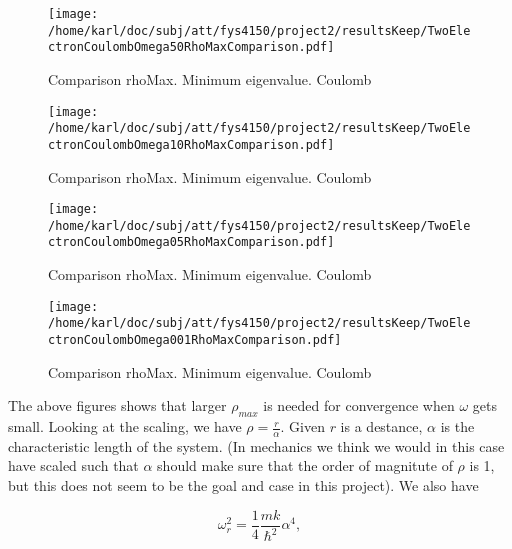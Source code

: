 \documentclass{article}
\begin{document}
\begin{minipage}{.49\textwidth} %
	\begin{figure}[H]
		\centering
		\texttt{[image: /home/karl/doc/subj/att/fys4150/project2/resultsKeep/TwoElectronCoulombOmega50RhoMaxComparison.pdf]}
		\caption{Comparison rhoMax. Minimum eigenvalue. Coulomb}
		\label{1}
	\end{figure}
\end{minipage}\hfill
\begin{minipage}{.49\textwidth}
	\begin{figure}[H]
		\centering
		\texttt{[image: /home/karl/doc/subj/att/fys4150/project2/resultsKeep/TwoElectronCoulombOmega10RhoMaxComparison.pdf]}
		\caption{Comparison rhoMax. Minimum eigenvalue. Coulomb}
		\label{1}
	\end{figure}
\end{minipage}\hfill
\begin{minipage}{.49\textwidth}
	\begin{figure}[H]
		\centering
		\texttt{[image: /home/karl/doc/subj/att/fys4150/project2/resultsKeep/TwoElectronCoulombOmega05RhoMaxComparison.pdf]}
		\caption{Comparison rhoMax. Minimum eigenvalue. Coulomb}
		\label{1}
	\end{figure}
\end{minipage}\hfill
\vspace{2ex}
\begin{minipage}{.49\textwidth}
	\begin{figure}[H]
		\centering
		\texttt{[image: /home/karl/doc/subj/att/fys4150/project2/resultsKeep/TwoElectronCoulombOmega001RhoMaxComparison.pdf]}
		\caption{Comparison rhoMax. Minimum eigenvalue. Coulomb}
		\label{1}
	\end{figure}
\end{minipage}\hfill
\vspace{2ex}

The above figures shows that larger $\rho_{max}$ is needed for convergence when $\omega$ gets small. Looking at the scaling, we have $\rho = \frac{r}{\alpha}$. Given $r$ is a destance, $\alpha$ is the characteristic length of the system. (In mechanics we think we would in this case have scaled such that $\alpha$ should make sure that the order of magnitute of $\rho$ is 1, but this does not seem to be the goal and case in this project). We also have 

\begin{equation*}
\omega_r^2=\frac{1}{4}\frac{mk}{\hbar^2} \alpha^4,
\end{equation*}
\end{document}
